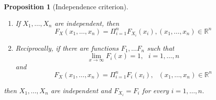 \documentclass[12pt]{report} \addtolength{\textheight}{2in}
\newtheorem{defn}{Definition}
\newtheorem{prop}{Proposition}
\newcommand{\Borel}{\mathscr{B}}
\newcommand{\totalint}{\int_{-\infty}^{\infty}}
\newcommand{\Realnum}{\mathbb{R}}
\begin{document}
\begin{prop} [Independence criterion]
\begin{enumerate}
\item [(a)] If $X_1, \dots, X_n$ are independent, then
\begin{displaymath}
F_X(x_1,\dots,x_n)=\Pi_{i=1} ^{n} F_{X_i} (x_i),  (x_1,\dots, x_n) \in \Realnum^n
\end{displaymath}
\item [(b)] Reciprocally, if there are functions $F_1,\dots F_n$ such that
\begin{displaymath}
\lim_{x\to\infty} F_i(x) =1,\hspace{8pt} i=1,\dots, n
\end{displaymath}
and
\begin{displaymath}
F_X(x_1,\dots,x_n) = \Pi_{i=1}^{n} F_i(x_i), \hspace{8pt} (x_1,\dots,x_n) \in \Realnum^n
\end{displaymath}
\end{enumerate}
then $X_1,\dots, X_n$ are independent and $F_{X_i}=F_i$ for every $i=1,\dots, n.$
\end{prop}
\end{document}
